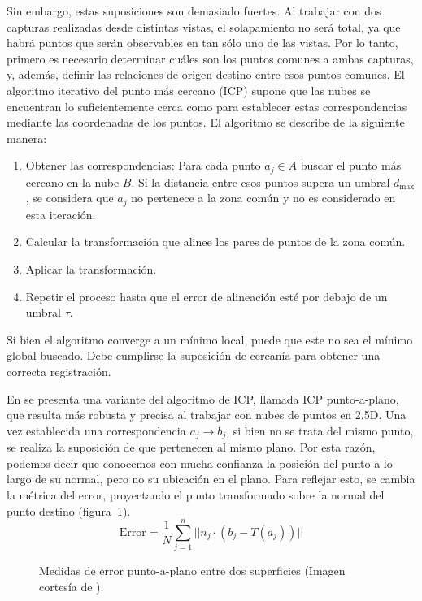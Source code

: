 Sin embargo, estas suposiciones son demasiado fuertes.
Al trabajar con dos capturas realizadas desde distintas vistas, el solapamiento no será total,
ya que habrá puntos que serán observables en tan sólo uno de las vistas.
Por lo tanto, primero es necesario determinar cuáles son los puntos comunes a ambas capturas,
y, además, definir las relaciones de origen-destino entre esos puntos comunes.
El algoritmo iterativo del punto más cercano (ICP) supone que las nubes se encuentran
lo suficientemente cerca como para establecer estas correspondencias mediante las coordenadas de los puntos.
El algoritmo se describe de la siguiente manera:
\begin{enumerate}
	\item Obtener las correspondencias:
		Para cada punto $a_j \in A$ buscar el punto más cercano en la nube $B$.
		Si la distancia entre esos puntos supera un umbral $d_{\text{max}}$,
		se considera que $a_j$ no pertenece a la zona común y no es considerado en esta iteración.
	\item Calcular la transformación que alinee los pares de puntos de la zona común.
	\item Aplicar la transformación.
	\item Repetir el proceso hasta que el error de alineación esté por debajo de un umbral $\tau$.
\end{enumerate}%
Si bien el algoritmo converge a un mínimo local, puede que este no sea el mínimo global buscado.
Debe cumplirse la suposición de cercanía para obtener una correcta registración.\cite{regBesl92}

En \cite{chen-medoni} se presenta una variante del algoritmo de ICP, llamada ICP {punto-a-plano},
que resulta más robusta y precisa al trabajar con nubes de puntos en 2.5D.
Una vez establecida una correspondencia $a_j \to b_j$, si bien no se trata del mismo punto,
se realiza la suposición de que pertenecen al mismo plano.
Por esta razón, podemos decir que conocemos con mucha confianza la posición del punto
a lo largo de su normal, pero no su ubicación en el plano.
Para reflejar esto, se cambia la métrica del error, proyectando el punto transformado sobre la normal
del punto destino (figura~\ref{fig:point_to_plane}).
\[
	\text{Error} = \frac{1}{N} \sum_{j=1}^n || n_j \cdot \left( b_j - T \left(a_j\right) \right) ||
\]

\begin{figure}
	\centering
	
	\caption[Medidas de error punto-a-plano entre dos superficies]{\label{fig:point_to_plane}Medidas de error punto-a-plano entre dos superficies
	(Imagen cortesía de \cite{icp_point_to_plane}).}
\end{figure}


